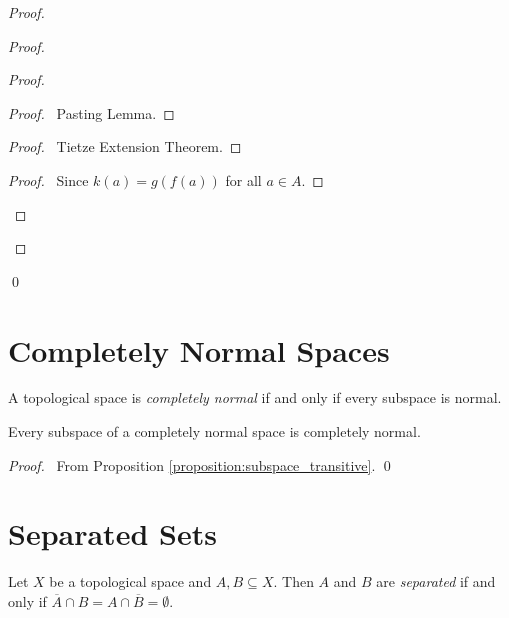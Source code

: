 \begin{proof}
\begin{proof}
\begin{proof}
            \begin{proof}
                \pf\ Pasting Lemma.
            \end{proof}
            \begin{proof}
                \pf\ Tietze Extension Theorem.
            \end{proof}
            \begin{proof}
                \pf\ Since $k(a) = g(f(a))$ for all $a \in A$.
            \end{proof}
        \end{proof}
    \end{proof}
    \qed
\end{proof}

\section{Completely Normal Spaces}

\begin{definition}
    A topological space is \emph{completely normal} if and only if every subspace is
    normal.
\end{definition}

\begin{proposition}
    Every subspace of a completely normal space is completely normal.
\end{proposition}

\begin{proof}
    \pf\ From Proposition \ref{proposition:subspace_transitive}. \qed
\end{proof}

\section{Separated Sets}

\begin{definition}[Separated]
    Let $X$ be a topological space and $A, B \subseteq X$. Then $A$ and $B$ are
    \emph{separated} if and only if $\overline{A} \cap B = A \cap \overline{B} = \emptyset$.
\end{definition}

